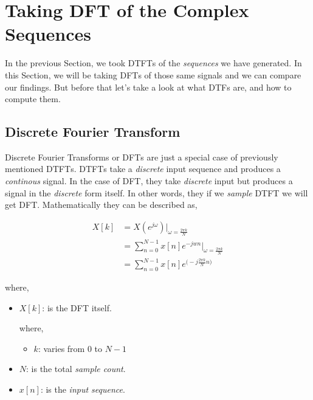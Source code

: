 \documentclass[../../course]{subfiles}
\begin{document}
\section{Taking DFT of the Complex Sequences} \label{sec:wrkTakingDFTCplxSeqs}

In the previous Section, we took \textsc{DTFT}s of the \emph{sequences} we have
generated. In this Section, we will be taking \textsc{DFT}s of those same signals
and we can compare our findings. But before that let's take a look at what \textsc{DTF}s
are, and how to compute them.

\subsection{Discrete Fourier Transform}

Discrete Fourier Transforms or \textsc{DFT}s are just a special case of previously
mentioned \textsc{DTFT}s. \textsc{DTFT}s take a \emph{discrete} input sequence and
produces a \emph{continous} signal. In the case of \textsc{DFT}, they take \emph{discrete}
input but produces a signal in the \emph{discrete} form itself. In other words, they
if we \emph{sample} \textsc{DTFT} we will get \textsc{DFT}. Mathematically they can
be described as,

\begin{align}
    X[k] &= X(e^{j\omega}) |_{\omega = \frac{2 \pi k}{N}} \\
    &= \sum_{n = 0}^{N - 1} x[n] e^{-j w n} \bigg|_{\omega = \frac{2 \pi k}{N}} \\
    &= \sum_{n = 0}^{N - 1} x[n] e^{\big(-j \frac{2 \pi k}{N} n \big)} \label{eqn:dftK}
\end{align}

where,

\begin{itemize} [label=]
    \item $X[k]$: is the \textsc{DFT} itself.

        where,

        \begin{itemize} [label=]
            \item $k$: varies from $0$ to $N - 1$
        \end{itemize}

    \item $N$: is the total \emph{sample count}.
    \item $x[n]$: is the \emph{input sequence}.

\end{itemize}
\end{document}
